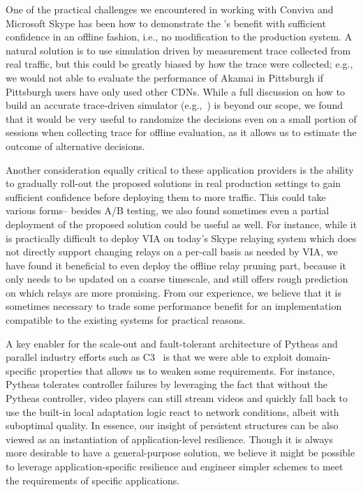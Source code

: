 
One of the practical challenges we encountered in working with
Conviva and Microsoft Skype has been how to demonstrate the 
\ddn's benefit with sufficient confidence in an offline fashion, 
i.e., no modification to the production system.
A natural solution is to use simulation driven by measurement
trace collected from real traffic, but this could be greatly 
biased by how
the trace were collected; e.g., we would not able to evaluate
the performance of Akamai in Pittsburgh if Pittsburgh 
users have only used other CDNs. 
While a full discussion on how to build an accurate trace-driven 
simulator (e.g.,~\cite{tariq2008answering}) is beyond our scope, 
we found that it would be very useful to randomize the decisions 
even on a small portion of sessions 
when collecting trace for offline evaluation, as it 
allows us to estimate the outcome of alternative decisions.

Another consideration equally critical to these application 
providers is the ability to gradually roll-out the proposed 
solutions in real production settings to gain sufficient confidence
before deploying them to more traffic. This could 
take various forms--
besides A/B testing, we also found sometimes even a 
partial deployment of the proposed solution could be useful as well.
For instance, while it is practically difficult to deploy 
VIA on today's Skype relaying system which does not 
directly support changing relays on a per-call basis
as needed by VIA, we have found it beneficial to 
even deploy the offline relay pruning part, because it only needs to
be updated on a coarse timescale, and still offers rough prediction
on which relays are more promising. 
From our experience, we believe that it is sometimes 
necessary to trade some performance benefit for an implementation
compatible to the existing systems for practical reasons.




A key enabler for the scale-out and fault-tolerant architecture of 
Pytheas and parallel industry efforts such as C3~\cite{c3} 
is that we
were able to  exploit domain-specific
properties that allows us to weaken some requirements.
For instance, Pytheas tolerates controller failures by leveraging
the fact that without the Pytheas controller, video players can 
still stream videos and quickly fall back to use the built-in local
adaptation logic react to
network conditions, 
albeit with suboptimal quality. In essence, our insight of 
persistent structures can be also viewed as an instantiation of
application-level resilience.
Though it is always more desirable to have a general-purpose 
solution, we believe it might be
possible to leverage application-specific resilience and
engineer simpler schemes to meet the requirements of 
specific applications.



